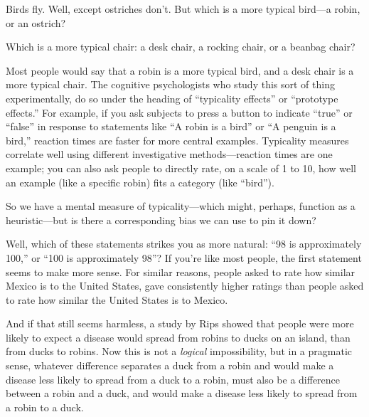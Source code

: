 {
 Birds fly. Well, except ostriches don't. But which
is a more typical bird---a robin, or an ostrich? }

{
 Which is a more typical chair: a desk chair, a rocking chair, or a
beanbag chair?}

{
 Most people would say that a robin is a more typical bird, and a
desk chair is a more typical chair. The cognitive psychologists who
study this sort of thing experimentally, do so under the heading of
``typicality effects'' or
``prototype
effects.'' For example, if you ask
subjects to press a button to indicate
``true'' or
``false'' in response to statements
like ``A robin is a bird'' or
``A penguin is a bird,'' reaction
times are faster for more central examples.
Typicality measures correlate well using different investigative
methods---reaction times are one example; you can also ask people to
directly rate, on a scale of 1 to 10, how well an example (like a
specific robin) fits a category (like
``bird'').}

{
 So we have a mental measure of typicality---which might, perhaps,
function as a heuristic---but is there a corresponding bias we can use
to pin it down?}

{
 Well, which of these statements strikes you as more natural:
``98 is approximately 100,'' or
``100 is approximately 98''? If
you're like most people, the first statement seems to
make more sense. For similar reasons, people asked
to rate how similar Mexico is to the United States, gave consistently
higher ratings than people asked to rate how similar the United States
is to Mexico.}

{
 And if that still seems harmless, a study by Rips showed that
people were more likely to expect a disease would spread from robins to
ducks on an island, than from ducks to robins. Now
this is not a \textit{logical} impossibility, but in a pragmatic sense,
whatever difference separates a duck from a robin and would make a
disease less likely to spread from a duck to a robin, must also be a
difference between a robin and a duck, and would make a disease less
likely to spread from a robin to a duck.}

